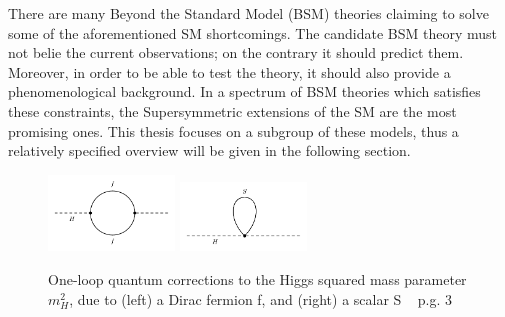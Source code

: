 There are many Beyond the Standard Model (BSM) theories claiming to solve some of the aforementioned SM shortcomings. The candidate BSM theory must not belie the current observations; on the contrary it should predict them. Moreover, in order to be able to test the theory, it should also provide a phenomenological background. 
In a spectrum of BSM theories which satisfies these constraints, the Supersymmetric extensions of the SM are the most promising ones.
This thesis focuses on a subgroup of these models, thus a relatively specified overview will be given in the following section. 

\begin{figure}[!hb]
\centering
  \includegraphics[width=0.3\textwidth]{Plots/feyndiagrams/susy_loop1.pdf}
    \includegraphics[width=0.3\textwidth]{Plots/feyndiagrams/susy_loop2.pdf}
  \caption{\label{fig:higgsloop} One-loop quantum corrections to the Higgs squared mass parameter $m_{H}^2$, due to (left) a Dirac fermion f, and (right) a scalar S ~\cite{SUSY1} p.g. 3}
\end{figure}

